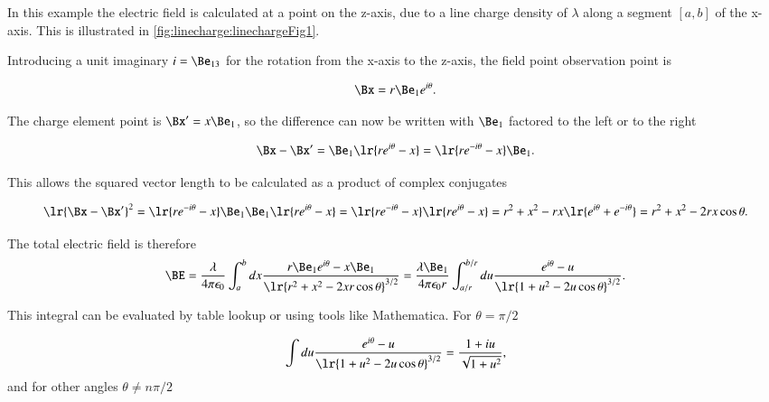 %
%
In this example the electric field is calculated at a point on the z-axis, due to a line charge density of \( \lambda \) along a segment \( [a,b] \) of the x-axis.
This is illustrated in \cref{fig:linecharge:linechargeFig1}.

Introducing a unit imaginary \( i = \Be_{13} \) for the rotation from the x-axis to the z-axis, the field point observation point is

\begin{dmath}\label{eqn:linecharge:120}
\Bx = r \Be_1 e^{i \theta}.
\end{dmath}

The charge element point is \( \Bx' = x \Be_1 \), so the difference can now be written with \( \Be_1 \) factored to the left or to the right

\begin{equation}\label{eqn:linecharge:20}
\Bx - \Bx'
= \Be_1\lr{ r e^{i\theta} - x }
= \lr{ r e^{-i\theta} - x } \Be_1.
\end{equation}

This allows the squared vector length to be calculated as a product of complex conjugates

\begin{dmath}\label{eqn:linecharge:40}
\lr{ \Bx - \Bx' }^2
= \lr{ r e^{-i\theta} - x } \Be_1 \Be_1\lr{ r e^{i\theta} - x }
= \lr{ r e^{-i\theta} - x } \lr{ r e^{i\theta} - x }
= r^2 + x^2 - r x \lr{ e^{i\theta} + e^{-i\theta} }
= r^2 + x^2 - 2 r x \cos\theta.
\end{dmath}

The total electric field is therefore
\begin{dmath}\label{eqn:linecharge:60}
\BE
= \frac{\lambda}{4 \pi \epsilon_0} \int_a^b dx \frac{ r \Be_1 e^{i\theta} - x \Be_1 }{ \lr{ r^2 + x^2 - 2 x r \cos\theta }^{3/2} }
= \frac{\lambda \Be_1}{4 \pi \epsilon_0 r} \int_{a/r}^{b/r} du \frac{ e^{i\theta} - u }{ \lr{ 1 + u^2 - 2 u \cos\theta }^{3/2} }.
\end{dmath}

This integral can be evaluated by table lookup or using tools like Mathematica.
For \( \theta = \pi/2 \)

\begin{dmath}\label{eqn:linecharge:80}
\int
du \frac{ e^{i\theta} - u }{ \lr{ 1 + u^2 - 2 u \cos\theta }^{3/2} }
= \frac{1 + i u}{\sqrt{1 + u^2}},
\end{dmath}
and for other angles \( \theta \neq n \pi/2 \)

